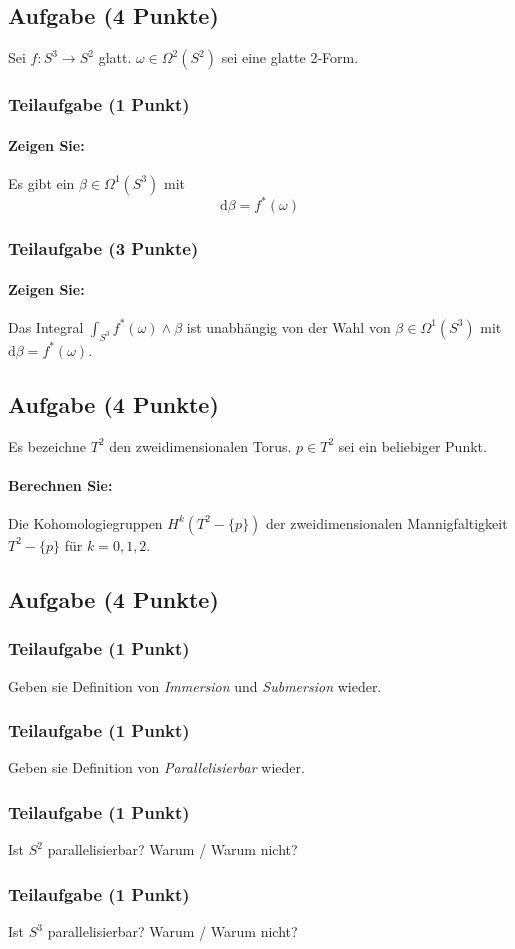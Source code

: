 \documentclass[12pt]{article}
\newcommand{\pfeil}[1]{\overset{#1}{\rightarrow}}
\renewcommand{\d}{\text{d}}
\begin{document}
\subsection{Aufgabe (4 Punkte)}
Sei $f : S^3 \pfeil{} S^2$ glatt. $\omega \in \Omega^2(S^2)$ sei eine glatte 2-Form.
\subsubsection{Teilaufgabe (1 Punkt)}
\paragraph{Zeigen Sie:} Es gibt ein $\beta \in \Omega^1(S^3)$ mit
\[ \d \beta = f^*(\omega) \]

\subsubsection{Teilaufgabe (3 Punkte)}
\paragraph{Zeigen Sie:} Das Integral $\int_{S^3} f^*(\omega) \wedge \beta$ ist unabhängig von der Wahl von $\beta \in \Omega^1(S^3)$ mit $\d \beta = f^*(\omega)$.

\subsection{Aufgabe (4 Punkte)}
Es bezeichne $T^2$ den zweidimensionalen Torus. $p \in T^2$ sei ein beliebiger Punkt.
\paragraph{Berechnen Sie:} Die Kohomologiegruppen $H^k(T^2 - \{p\})$ der zweidimensionalen Mannigfaltigkeit $T^2 - \{p\}$ für $k = 0,1,2$.

\subsection{Aufgabe (4 Punkte)}
\subsubsection{Teilaufgabe (1 Punkt)}
Geben sie Definition von \textit{Immersion} und \textit{Submersion} wieder.
\subsubsection{Teilaufgabe (1 Punkt)}
Geben sie Definition von \textit{Parallelisierbar} wieder.
\subsubsection{Teilaufgabe (1 Punkt)}
Ist $S^2$ parallelisierbar? Warum / Warum nicht?
\subsubsection{Teilaufgabe (1 Punkt)}
Ist $S^3$ parallelisierbar? Warum / Warum nicht?
\end{document}
